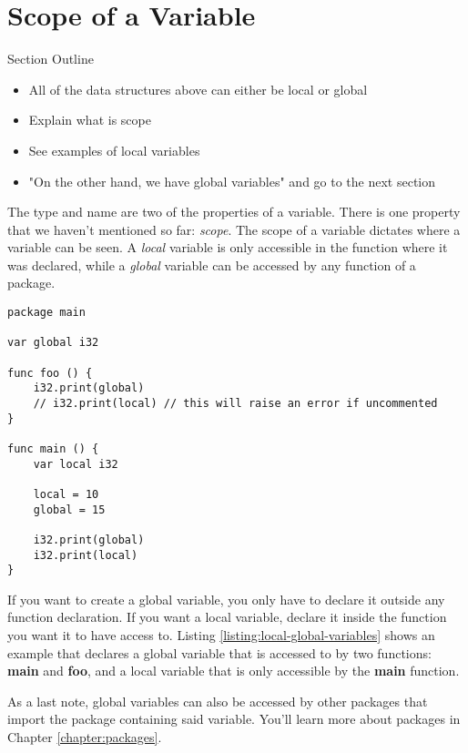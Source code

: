 \documentclass[11pt,fleqn,openany]{book} %
\begin{document}
\section{Scope of a Variable}

\begin{remark}
Section Outline
    \begin{itemize}
    	\item All of the data structures above can either be local or global
        \item Explain what is scope
        \item See examples of local variables
        \item "On the other hand, we have global variables" and go to the next section
    \end{itemize}
\end{remark}

The type and name are two of the properties of a variable. There is one property that we haven't mentioned so far: \emph{scope}. The scope of a variable dictates where a variable can be seen. A \emph{local} variable is only accessible in the function where it was declared, while a \emph{global} variable can be accessed by any function of a package.

\begin{lstlisting}[caption={Usage of Local and Global Variables},captionpos=b,label={listing:local-global-variables}]
package main

var global i32

func foo () {
    i32.print(global)
    // i32.print(local) // this will raise an error if uncommented
}

func main () {
    var local i32
    
    local = 10
    global = 15
    
    i32.print(global)
    i32.print(local)
}
\end{lstlisting}

If you want to create a global variable, you only have to declare it outside any function declaration. If you want a local variable, declare it inside the function you want it to have access to. Listing \ref{listing:local-global-variables} shows an example that declares a global variable that is accessed to by two functions: \textbf{main} and \textbf{foo}, and a local variable that is only accessible by the \textbf{main} function.

As a last note, global variables can also be accessed by other packages that import the package containing said variable. You'll learn more about packages in Chapter \ref{chapter:packages}.
\end{document}
